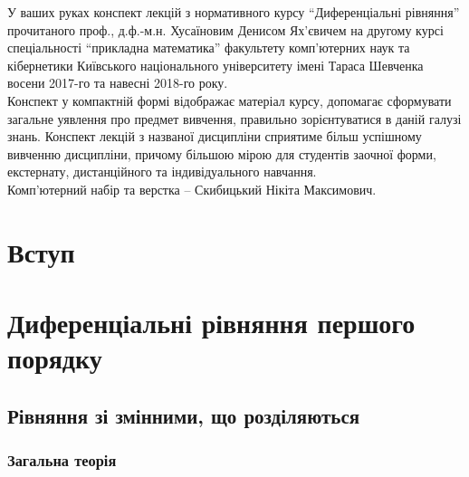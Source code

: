 




\maketitle \thispagestyle{empty} \newpage 

У ваших руках конспект лекцій з нормативного курсу ``Диференціальні рівняння'' прочитаного проф., д.ф.-м.н. Хусаїновим Денисом Ях'євичем на другому курсі спеціальності ``прикладна математика'' факультету ком\-п'ю\-тер\-них наук та кібернетики Київського національного університету імені Тараса Шевченка восени 2017-го та навесні 2018-го року. \\

Конспект у компактній формі відображає матеріал курсу, допомагає сформувати загальне уявлення про предмет вивчення, правильно зорієнтуватися в даній галузі знань. Конспект лекцій з названої дисципліни сприятиме більш успішному вивченню дисципліни, причому більшою мірою для студентів заочної форми, екстернату, дистанційного та індивідуального навчання. \\

Комп'ютерний набір та верстка -- Скибицький Нікіта Максимович. \newpage

\tableofcontents \newpage

\section*{Вступ}


\section{Диференціальні рівняння першого порядку}


	\subsection{Рівняння зі змінними, що розділяються}
	

		\subsubsection{Загальна теорія}
		

